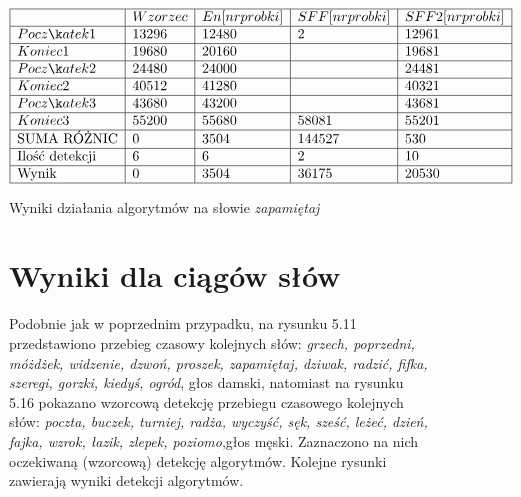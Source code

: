 \documentclass[eng,printmode]{mgr}
\begin{document}
	 \begin{figure}
	 	\begin{center}
	 		$\begin{array}{ | l | l | l | l | l | }
	 		\hline
	 		& Wzorzec & En[nr probki] & SFF[nr probki] & SFF2[nr probki] \\ \hline
	 		Początek1 & 13296 & 12480 & 2 & 12961 \\ \hline
	 		Koniec1 & 19680 & 20160 & & 19681   \\ \hline
	 		Początek2 & 24480 & 24000 & & 24481    \\ \hline
	 		Koniec2 & 40512 & 41280 & & 40321  \\ \hline
	 		Początek3 & 43680 & 43200 & & 43681   \\ \hline
	 		Koniec3 & 55200 & 55680 & 58081 & 55201 \\ \hline
	 		\textrm{SUMA RÓŻNIC} & 0 & 3504 & 144527 & 530 \\ \hline
	 		\textrm{Ilość detekcji} & 6 & 6 & 2 & 10 \\ \hline
	 		\textrm{Wynik} & 0 & 3504 & 36175 & 20530 \\ \hline
	 		\end{array}
	 		$
	 		\caption{Wyniki działania algorytmów na słowie \emph{zapamiętaj}}
	 	\end{center}
	 	
	 \end{figure}
	 
	 
\begin{figure}

\section{Wyniki dla ciągów słów}
	Podobnie jak w poprzednim przypadku, na rysunku 5.11 przedstawiono przebieg czasowy kolejnych słów: \emph{grzech, poprzedni, móżdżek, widzenie, dzwoń, proszek, zapamiętaj, dziwak, radzić, fifka, szeregi, gorzki, kiedyś, ogród}, głos damski, natomiast na rysunku 5.16 pokazano wzorcową detekcję przebiegu czasowego kolejnych słów: \emph{poczta, buczek, turniej, radża, wyczyść, sęk, sześć, leżeć, dzień, fajka, wzrok, łazik, zlepek, poziomo},głos męski. Zaznaczono na nich oczekiwaną (wzorcową) detekcję algorytmów.
	Kolejne rysunki zawierają wyniki detekcji algorytmów.\\
	
	
\end{figure}
\end{document}
